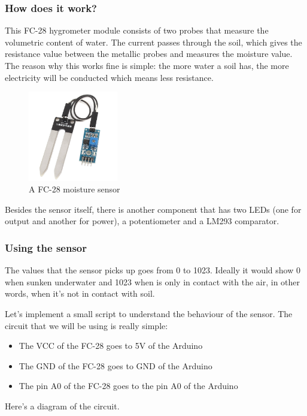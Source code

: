 \subsubsection{How does it work?}
This FC-28 hygrometer module consists of two probes that measure the volumetric content of water. The current passes through the soil, which gives the resistance value between the metallic probes and measures the moisture value. The reason why this works fine is simple: the more water a soil has, the more electricity will be conducted which means less resistance.

\begin{figure}[H]
    \centering
    \includegraphics[width=0.35\textwidth]{fig/fc28.jpg}
    \caption{A FC-28 moisture sensor}
    \label{fig:fc28}
\end{figure}

Besides the sensor itself, there is another component that has two LEDs (one for output and another for power), a potentiometer and a LM293\cite{lm293datasheet} comparator.

\subsubsection{Using the sensor}
The values that the sensor picks up goes from 0 to 1023. Ideally it would show 0 when sunken underwater and 1023 when is only in contact with the air, in other words, when it's not in contact with soil.

Let's implement a small script to understand the behaviour of the sensor. The circuit that we will be using is really simple:
\begin{itemize}
	\item The VCC of the FC-28 goes to 5V of the Arduino
	\item The GND of the FC-28 goes to GND of the Arduino
	\item The pin A0 of the FC-28 goes to the pin A0 of the Arduino
\end{itemize}
Here's a diagram of the circuit.

